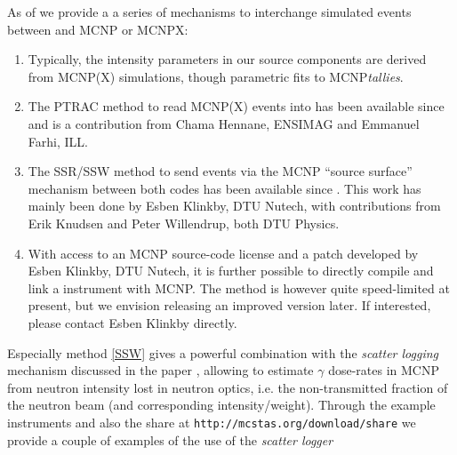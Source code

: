 As of  we provide a a series of mechanisms to interchange simulated events
between \MCS and MCNP or MCNPX:
\begin{enumerate}
  \item Typically, the intensity parameters in our \MCS source components are
    derived from MCNP(X) simulations, though parametric fits to MCNP\emph{tallies}.
  \item The PTRAC method to read MCNP(X) events into \MCS has been
    available since  and is a contribution from Chama
    Hennane, ENSIMAG and Emmanuel Farhi, ILL.
  \item The SSR/SSW method to send events via the MCNP ``source
    surface'' mechanism between both codes has been available since
    . This work has mainly been done by Esben Klinkby, DTU
    Nutech, with contributions from Erik Knudsen and Peter Willendrup,
    both DTU Physics. \label{SSW}
  \item With access to an MCNP source-code license and a patch
    developed by Esben Klinkby, DTU Nutech, it is further
    possible to directly compile and link a \MCS instrument with
    MCNP. The method is however quite speed-limited at present, but we
    envision releasing an improved version later. If interested,
    please contact Esben Klinkby directly.
\end{enumerate}
Especially method \ref{SSW} gives a powerful combination with the
\emph{scatter logging} mechanism discussed in the paper
\cite{BergbaeckKnudsen201420}, allowing to estimate $\gamma$ dose-rates
in MCNP from neutron intensity lost in neutron optics, i.e. the non-transmitted
fraction of the \MCS neutron beam (and corresponding
intensity/weight). Through the \MCS example instruments and also the \MCS share at
\verb+http://mcstas.org/download/share+ we provide a couple of
examples of the use of the \emph{scatter logger}
